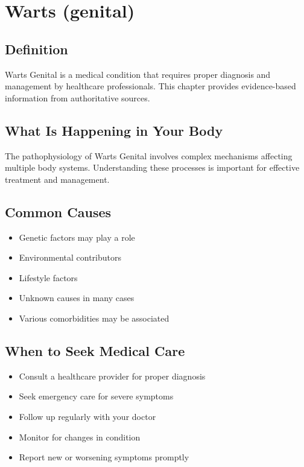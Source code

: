 
\chapter{Warts (genital)}

\section*{Definition}
Warts Genital is a medical condition that requires proper diagnosis and management by healthcare professionals. This chapter provides evidence-based information from authoritative sources.

\section*{What Is Happening in Your Body}
The pathophysiology of Warts Genital involves complex mechanisms affecting multiple body systems. Understanding these processes is important for effective treatment and management.

\section*{Common Causes}
\begin{itemize}
  \item Genetic factors may play a role
  \item Environmental contributors
  \item Lifestyle factors
  \item Unknown causes in many cases
  \item Various comorbidities may be associated
\end{itemize}

\section*{When to Seek Medical Care}
\begin{itemize}
  \item Consult a healthcare provider for proper diagnosis
  \item Seek emergency care for severe symptoms
  \item Follow up regularly with your doctor
  \item Monitor for changes in condition
  \item Report new or worsening symptoms promptly
\end{itemize}

